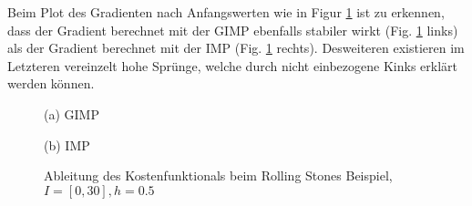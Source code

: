 Beim Plot des Gradienten nach Anfangswerten wie in Figur \ref{fig:rollingGrad} ist zu erkennen, dass der Gradient berechnet mit der GIMP ebenfalls stabiler wirkt (Fig. \ref{fig:rollingGrad} links) als der Gradient berechnet mit der IMP (Fig. \ref{fig:rollingGrad} rechts). Desweiteren existieren im Letzteren vereinzelt hohe Sprünge, welche durch nicht einbezogene Kinks erklärt werden können. 
\begin{figure}[H]
\footnotesize 
\centering
\begin{minipage}[b]{0.49\linewidth}

\end{minipage}
\begin{minipage}[b]{0.49\linewidth}

\end{minipage}
\begin{minipage}[b]{0.49\linewidth}

\caption*{(a) GIMP}
\end{minipage}
\begin{minipage}[b]{0.49\linewidth}

\caption*{(b) IMP}
\end{minipage}
\caption{Ableitung des Kostenfunktionals beim Rolling Stones Beispiel, $I = [0,30],h=0.5$}
\label{fig:rollingGrad}
\end{figure}


